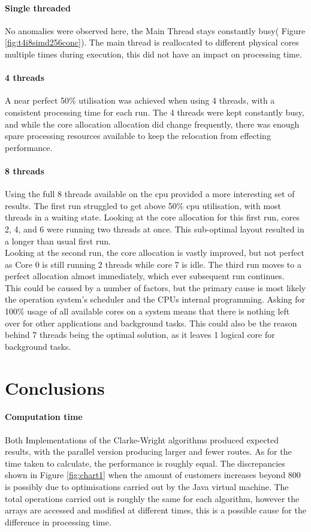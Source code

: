\documentclass[conference]{acmsiggraph}
\begin{document}
\paragraph{Single threaded}
No anomalies were observed here, the Main Thread stays constantly busy( Figure \ref{fig:t4i8simd256conc}). 
The main thread is reallocated to different physical cores multiple times during execution, this did not have an impact on processing time.

\paragraph{4 threads}
A near perfect 50\% utilisation was achieved when using 4 threads, with a consistent processing time for each run. 
The 4 threads were kept constantly busy, and while the core allocation allocation did change frequently, there was enough spare processing resources available to keep the relocation from effecting performance.

\paragraph{8 threads}
Using the full 8 threads available on the cpu provided a more interesting set of results. The first run struggled to get above 50\% cpu utilisation, with most threads in a waiting state. Looking at the core allocation for this first run, cores 2, 4, and 6 were running two threads at once. This sub-optimal layout resulted in a longer than usual first run. \\
Looking at the second run, the core allocation is vastly improved, but not perfect as Core 0 is still running 2 threads while core 7 is idle.
The third run moves to a perfect allocation almost immediately, which ever subsequent run continues.
\\
This could be caused by a number of factors, but the primary cause is most likely the operation system's scheduler and the CPUs internal programming.
Asking for 100\% usage of all available cores on a system means that there is nothing left over for other applications and background tasks.
This could also be the reason behind 7 threads being the optimal solution, as it leaves 1 logical core for background tasks.

\section{Conclusions}
\paragraph{Computation time}
Both Implementations of the Clarke-Wright algorithms produced expected results, with the parallel version producing larger and fewer routes. As for the time taken to calculate, the performance is roughly equal.
The discrepancies shown in Figure \ref{fig:chart1} when the amount of customers increases beyond 800 is possibly due to optimisations carried out by the Java virtual machine. The total operations carried out is roughly the same for each algorithm, however the arrays are accessed and modified at different times, this is a possible cause for the difference in processing time.
\end{document}
